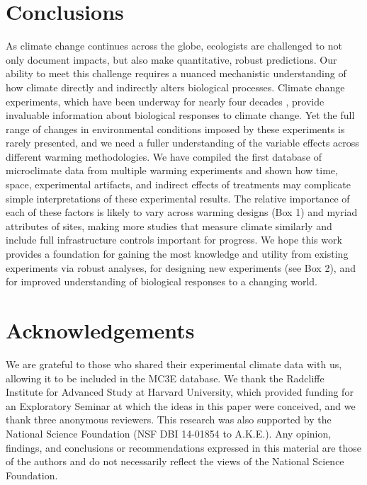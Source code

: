 \documentclass{article}
\begin{document}
\section* {Conclusions}
\par As climate change continues across the globe, ecologists are challenged to not only document impacts, but also make quantitative, robust predictions. Our ability to meet this challenge requires a nuanced mechanistic understanding of how climate directly and indirectly alters biological processes. Climate change experiments, which have been underway for nearly four decades \citep[e.g.,][]{tamaki1981,carlson1982,melillo2017}, provide invaluable information about biological responses to climate change. Yet the full range of changes in environmental conditions imposed by these experiments is rarely presented, and we need a fuller understanding of the variable effects across different warming methodologies. We have compiled the first database of microclimate data from multiple warming experiments and shown how time, space, experimental artifacts, and indirect effects of treatments may complicate simple interpretations of these experimental results. The relative importance of each of these factors is likely to vary across warming designs (Box 1) and myriad attributes of sites, making more studies that measure climate similarly and include full infrastructure controls important for progress. %
We hope this work provides a foundation for gaining the most knowledge and utility from existing experiments via robust analyses, for designing new experiments (see Box 2), and for improved understanding of biological responses to a changing world.

 \section* {Acknowledgements}
We are grateful to those who shared their experimental climate data with us, allowing it to be included in the MC3E database. We thank the Radcliffe Institute for Advanced Study at Harvard University, which provided funding for an Exploratory Seminar at which the ideas in this paper were conceived, and we thank three anonymous reviewers. This research was also supported by the National Science Foundation (NSF DBI 14-01854 to A.K.E.). Any opinion, findings, and conclusions or recommendations expressed in this material are those of the authors and do not necessarily reflect the views of the National Science Foundation.
\clearpage
\end{document}
